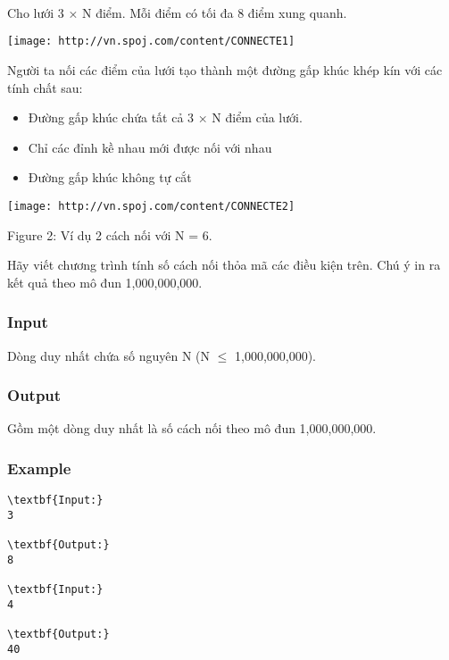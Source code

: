 

 

 

 

Cho lưới 3 × N điểm. Mỗi điểm có tối đa 8 điểm xung quanh.


\texttt{[image: http://vn.spoj.com/content/CONNECTE1]}

Người ta nối các điểm của lưới tạo thành một đường gấp khúc khép kín với các tính chất sau:
\begin{itemize}
	\item Đường gấp khúc chứa tất cả 3 × N điểm của lưới.
	\item Chỉ các đỉnh kề nhau mới được nối với nhau
	\item Đường gấp khúc không tự cắt
\end{itemize}


\texttt{[image: http://vn.spoj.com/content/CONNECTE2]}

Figure 2: Ví dụ 2 cách nối với N = 6.

Hãy viết chương trình tính số cách nối thỏa mã các điều kiện trên. Chú ý in ra kết quả theo mô đun 1,000,000,000.

\subsubsection{Input}

Dòng duy nhất chứa số nguyên N (N  $\le$  1,000,000,000).

\subsubsection{Output}

Gồm một dòng duy nhất là số cách nối theo mô đun 1,000,000,000.

\subsubsection{Example}
\begin{verbatim}
\textbf{Input:}
3

\textbf{Output:}
8

\textbf{Input:}
4

\textbf{Output:}
40\end{verbatim}

 
